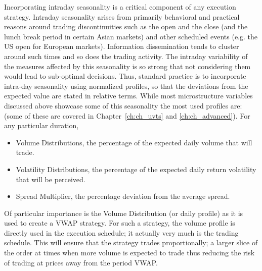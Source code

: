 Incorporating intraday seasonality is a critical component of any execution strategy. Intraday seasonality arises from primarily behavioral and practical reasons around trading discontinuities such as the open and the close (and the lunch break period in certain Asian markets) and other scheduled events (e.g. the US open for European markets). Information dissemination tends to cluster around such times and so does the trading activity. The intraday variability of the measures affected by this seasonality is so strong that not considering them would lead to sub-optimal decisions. Thus, standard practice is to incorporate intra-day seasonality using normalized profiles, so that the deviations from the expected value are stated in relative terms. While most microstructure variables discussed above showcase some of this seasonality the most used profiles are: (some of these are covered in Chapter~\ref{ch:ch_uvts} and \ref{ch:ch_advanced}). For any particular duration,
	\begin{itemize}
	\item Volume Distributions, the percentage of the expected daily volume that will trade.
	\item Volatility Distributions, the percentage of the expected daily return volatility that will  be perceived.
	\item Spread Multiplier, the percentage deviation from the average spread.
	\end{itemize}
Of particular importance is the Volume Distribution (or daily profile) as it is used to create a VWAP strategy. For such a strategy, the volume profile is directly used in the execution schedule; it actually very much is the trading schedule. This will ensure that the strategy trades proportionally; a larger slice of the order at times when more volume is expected to trade thus reducing the risk of trading at prices away from the period VWAP.


